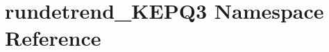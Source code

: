 \hypertarget{namespacerundetrend__KEPQ3}{\section{rundetrend\-\_\-\-K\-E\-P\-Q3 Namespace Reference}
\label{namespacerundetrend__KEPQ3}
}
